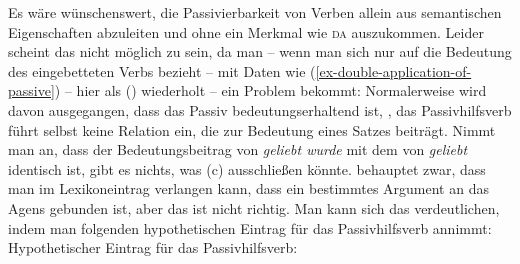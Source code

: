 {%


Es wäre wünschenswert, die Passivierbarkeit von Verben allein aus semantischen Eigenschaften abzuleiten
und ohne ein Merkmal wie \textsc{da} auszukommen. Leider scheint das nicht möglich zu sein, 
da man -- wenn man sich nur auf die Bedeutung des eingebetteten
Verbs bezieht -- mit Daten wie (\ref{ex-double-application-of-passive}) -- hier als () wiederholt --
ein Problem bekommt: Normalerweise wird davon ausgegangen, dass das Passiv bedeutungserhaltend ist, 
\dash, das Passivhilfsverb führt selbst keine Relation ein, die zur Bedeutung eines Satzes beiträgt. 
\eal
\label{ex-double-application-of-passive-zwei}
\zl
Nimmt man an, dass der Bedeutungsbeitrag von \emph{geliebt wurde} mit dem von \emph{geliebt} identisch ist,
gibt es nichts, was (c) ausschließen könnte. \citet[]{Gunkel2003b} behauptet zwar, 
dass man im Lexikoneintrag verlangen kann, dass ein bestimmtes Argument an das Agens gebunden ist, aber
das ist nicht richtig. Man kann sich das verdeutlichen, indem man folgenden hypothetischen
Eintrag für das Passivhilfsverb annimmt:
\eas
\label{le-passiv-gunkel}
Hypothetischer Eintrag für das Passivhilfsverb:\\
}
